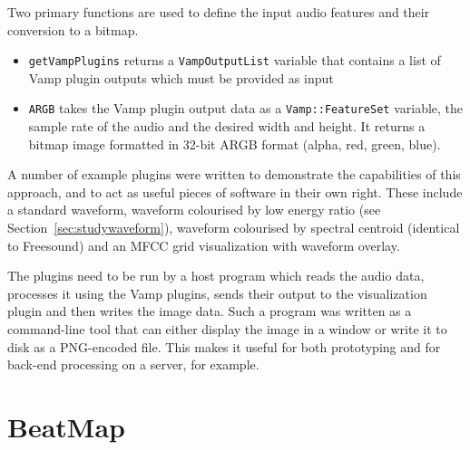 Two primary functions are used to define the input audio features and their conversion to a bitmap.

\begin{itemize}
  \item \texttt{getVampPlugins} returns a \texttt{VampOutputList} variable that contains a list of Vamp plugin outputs
    which must be provided as input
  \item \texttt{ARGB} takes the Vamp plugin output data as a \texttt{Vamp::FeatureSet} variable, the sample rate of the
    audio and the desired width and height. It returns a bitmap image formatted in 32-bit ARGB format (alpha, red,
    green, blue).
\end{itemize}

A number of example plugins were written to demonstrate the capabilities of this approach, and to act as useful pieces
of software in their own right.  These include a standard waveform, waveform colourised by low energy ratio (see
Section~\ref{sec:studywaveform}), waveform colourised by spectral centroid (identical to Freesound) and an MFCC grid
visualization with waveform overlay.

The plugins need to be run by a host program which reads the audio data, processes it using the Vamp plugins, sends
their output to the visualization plugin and then writes the image data. Such a program was written as a command-line
tool that can either display the image in a window or write it to disk as a PNG-encoded file. This makes it useful for
both prototyping and for back-end processing on a server, for example.

\clearpage
\section{BeatMap}\label{sec:beatmap}

